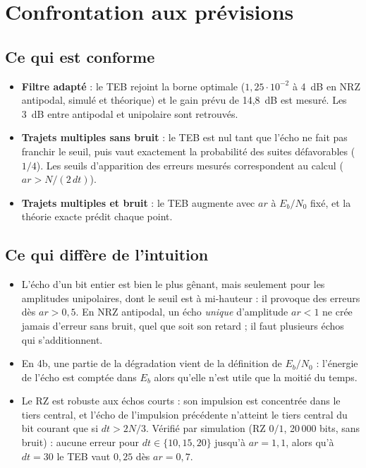 \documentclass[11pt,a4paper]{article}
\newcommand{\EbNo}{E_b/N_0}
\begin{document}
\section{Confrontation aux prévisions}
\subsection{Ce qui est conforme}
\begin{itemize}
  \item \textbf{Filtre adapté} : le TEB rejoint la borne optimale ($1{,}25\cdot10^{-2}$ à 4~dB en NRZ antipodal, simulé et théorique) et le gain prévu de 14,8~dB est mesuré. Les 3~dB entre antipodal et unipolaire sont retrouvés.
  \item \textbf{Trajets multiples sans bruit} : le TEB est nul tant que l'écho ne fait pas franchir le seuil, puis vaut exactement la probabilité des suites défavorables ($1/4$). Les seuils d'apparition des erreurs mesurés correspondent au calcul ($ar > N/(2\,dt)$).
  \item \textbf{Trajets multiples et bruit} : le TEB augmente avec $ar$ à $\EbNo$ fixé, et la théorie exacte prédit chaque point.
\end{itemize}
\subsection{Ce qui diffère de l'intuition}
\begin{itemize}
  \item L'écho d'un bit entier est bien le plus gênant, mais seulement pour les amplitudes unipolaires, dont le seuil est à mi-hauteur : il provoque des erreurs dès $ar > 0{,}5$. En NRZ antipodal, un écho \emph{unique} d'amplitude $ar < 1$ ne crée jamais d'erreur sans bruit, quel que soit son retard ; il faut plusieurs échos qui s'additionnent.
  \item En 4b, une partie de la dégradation vient de la définition de $\EbNo$ : l'énergie de l'écho est comptée dans $E_b$ alors qu'elle n'est utile que la moitié du temps.
  \item Le RZ est robuste aux échos courts : son impulsion est concentrée dans le tiers central, et l'écho de l'impulsion précédente n'atteint le tiers central du bit courant que si $dt > 2N/3$. Vérifié par simulation (RZ $0/1$, 20\,000 bits, sans bruit) : aucune erreur pour $dt \in \{10, 15, 20\}$ jusqu'à $ar = 1{,}1$, alors qu'à $dt = 30$ le TEB vaut $0{,}25$ dès $ar = 0{,}7$.
\end{itemize}
\end{document}
